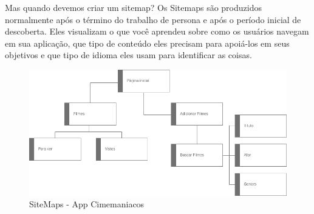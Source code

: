 Mas quando devemos criar um sitemap? Os Sitemaps são produzidos normalmente após o término do trabalho de persona e após o período inicial de descoberta. Eles visualizam o que você aprendeu sobre como os usuários navegam em sua aplicação, que tipo de conteúdo eles precisam para apoiá-los em seus objetivos e que tipo de idioma eles usam para identificar as coisas.

\begin{figure}[H]
	\centering
	\includegraphics[scale=0.4]{imagens/sitemap.jpg}
	\caption{SiteMaps - App Cimemaniacos}
\end{figure}


